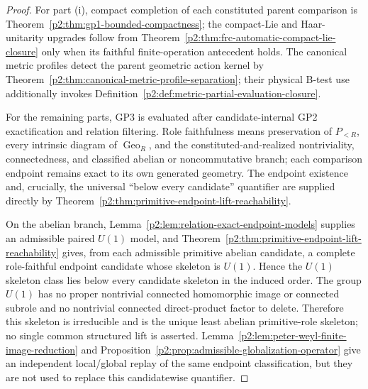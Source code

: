 \documentclass[12pt,a4paper]{article}
\begin{document}
\begin{proof}
For part (i), compact completion of each constituted parent comparison is
Theorem~\ref{p2:thm:gp1-bounded-compactness}; the compact-Lie and
Haar-unitarity upgrades follow from
Theorem~\ref{p2:thm:frc-automatic-compact-lie-closure} only when its
faithful finite-operation antecedent holds.  The canonical metric
profiles detect the parent geometric action kernel by
Theorem~\ref{p2:thm:canonical-metric-profile-separation}; their physical
B-test use additionally invokes
Definition~\ref{p2:def:metric-partial-evaluation-closure}.

For the remaining parts, GP3 is evaluated after candidate-internal GP2
exactification and relation filtering.  Role faithfulness means preservation
of \(P_{<R}\), every intrinsic diagram of \(\operatorname{Geo}_R\), and the
constituted-and-realized nontriviality, connectedness, and classified abelian
or noncommutative branch; each comparison endpoint remains exact to its own
generated geometry.
The endpoint existence and, crucially, the universal
``below every candidate'' quantifier are supplied directly by
Theorem~\ref{p2:thm:primitive-endpoint-lift-reachability}.

On the abelian branch, Lemma~\ref{p2:lem:relation-exact-endpoint-models}
supplies an admissible paired \(U(1)\) model, and
Theorem~\ref{p2:thm:primitive-endpoint-lift-reachability} gives, from
each admissible primitive abelian candidate, a complete role-faithful endpoint
candidate whose skeleton is \(U(1)\).  Hence the \(U(1)\)
skeleton class lies below every candidate skeleton in the induced order.  The
group \(U(1)\) has no proper nontrivial connected homomorphic image or
connected subrole and no nontrivial connected direct-product factor to delete.
Therefore this skeleton is irreducible and is the unique least abelian
primitive-role skeleton; no single common structured lift is asserted.  Lemma~\ref{p2:lem:peter-weyl-finite-image-reduction} and
Proposition~\ref{p2:prop:admissible-globalization-operator} give an independent
local/global replay of the same endpoint classification, but they are not used
to replace this candidatewise quantifier.


\end{proof}
\end{document}
